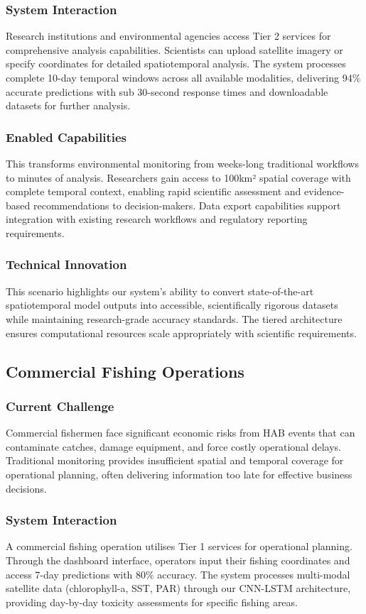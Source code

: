 \documentclass[conference]{IEEEtran}
\begin{document}
\subsubsection{System Interaction}
Research institutions and environmental agencies access Tier 2 services for comprehensive analysis capabilities. Scientists can upload satellite imagery or specify coordinates for detailed spatiotemporal analysis. The system processes complete 10-day temporal windows across all available modalities, delivering 94\% accurate predictions with sub 30-second response times and downloadable datasets for further analysis.
\subsubsection{Enabled Capabilities}
This transforms environmental monitoring from weeks-long traditional workflows to minutes of analysis. Researchers gain access to 100km² spatial coverage with complete temporal context, enabling rapid scientific assessment and evidence-based recommendations to decision-makers. Data export capabilities support integration with existing research workflows and regulatory reporting requirements.
\subsubsection{Technical Innovation}
This scenario highlights our system's ability to convert state-of-the-art spatiotemporal model outputs into accessible, scientifically rigorous datasets while maintaining research-grade accuracy standards. The tiered architecture ensures computational resources scale appropriately with scientific requirements.


\subsection{Commercial Fishing Operations}
\subsubsection{Current Challenge}
Commercial fishermen face significant economic risks from HAB events that can contaminate catches, damage equipment, and force costly operational delays. Traditional monitoring provides insufficient spatial and temporal coverage for operational planning, often delivering information too late for effective business decisions.
\subsubsection{System Interaction}
A commercial fishing operation utilises Tier 1 services for operational planning. Through the dashboard interface, operators input their fishing coordinates and access 7-day predictions with 80\% accuracy. The system processes multi-modal satellite data (chlorophyll-a, SST, PAR) through our CNN-LSTM architecture, providing day-by-day toxicity assessments for specific fishing areas.
\end{document}
